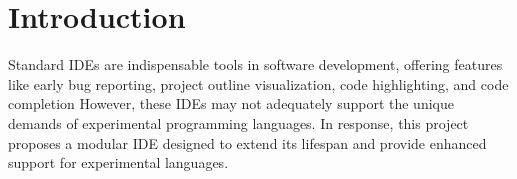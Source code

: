 \section{Introduction}

Standard IDEs are indispensable tools in software development, offering features
like early bug reporting, project outline visualization, code highlighting, and
code completion However, these IDEs may not adequately support the unique
demands of experimental programming languages.
In response, this project proposes
a modular IDE designed to extend its lifespan and provide enhanced support for
experimental languages.
